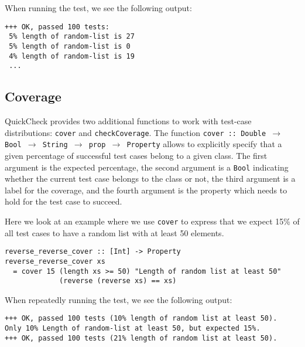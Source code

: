 When running the test, we see the following output:

\begin{footnotesize}
\begin{verbatim}
+++ OK, passed 100 tests:
 5% length of random-list is 27
 5% length of random-list is 0
 4% length of random-list is 19
 ...
\end{verbatim}
\end{footnotesize}

\subsection{Coverage}
QuickCheck provides two additional functions to work with test-case distributions: \texttt{cover} and \texttt{checkCoverage}. The function \texttt{cover :: Double $\rightarrow$ Bool $\rightarrow$ String $\rightarrow$ prop $\rightarrow$ Property} allows to explicitly specify that a given percentage of successful test cases belong to a given class. The first argument is the expected percentage, the second argument is a \texttt{Bool} indicating whether the current test case belongs to the class or not, the third argument is a label for the coverage, and the fourth argument is the property which needs to hold for the test case to succeed. 

Here we look at an example where we use \texttt{cover} to express that we expect 15\% of all test cases to have a random list with at least 50 elements.

\begin{footnotesize}
\begin{verbatim}
reverse_reverse_cover :: [Int] -> Property
reverse_reverse_cover xs  
  = cover 15 (length xs >= 50) "Length of random list at least 50"
             (reverse (reverse xs) == xs)
\end{verbatim}
\end{footnotesize}

When repeatedly running the test, we see the following output:

\begin{footnotesize}
\begin{verbatim}
+++ OK, passed 100 tests (10% length of random list at least 50).
Only 10% Length of random-list at least 50, but expected 15%.
+++ OK, passed 100 tests (21% length of random list at least 50).
\end{verbatim}
\end{footnotesize}

